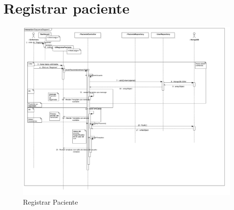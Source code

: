 \section{Registrar paciente}
\begin{figure}[htbp!]
		\centering
			\includegraphics[width=1\textwidth]{uml/DiagramasSecuencia/RubenMurga/insertPaciente}
		\caption{Registrar Paciente}
	\end{figure}